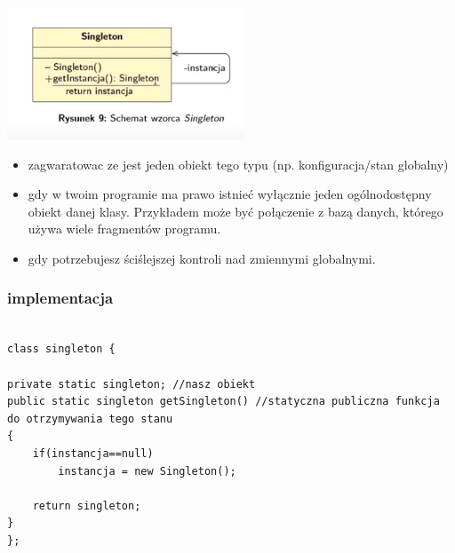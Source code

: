 \documentclass[11pt]{article}
\begin{document}
\begin{center}
\includegraphics[width=.9\linewidth]{./singleton.png}
\end{center}
\begin{itemize}
\item zagwaratowac ze jest jeden obiekt tego typu (np. konfiguracja/stan globalny)
\item gdy w twoim programie ma prawo istnieć wyłącznie jeden ogólnodostępny obiekt danej klasy. Przykładem może być połączenie z bazą danych, którego używa wiele fragmentów programu.
\item gdy potrzebujesz ściślejszej kontroli nad zmiennymi globalnymi.
\end{itemize}
\subsubsection{implementacja}
\label{sec:orga0968af}
\begin{verbatim}

class singleton {

private static singleton; //nasz obiekt
public static singleton getSingleton() //statyczna publiczna funkcja do otrzymywania tego stanu
{
	if(instancja==null)
		instancja = new Singleton();

	return singleton;
}
};

\end{verbatim}
\end{document}
